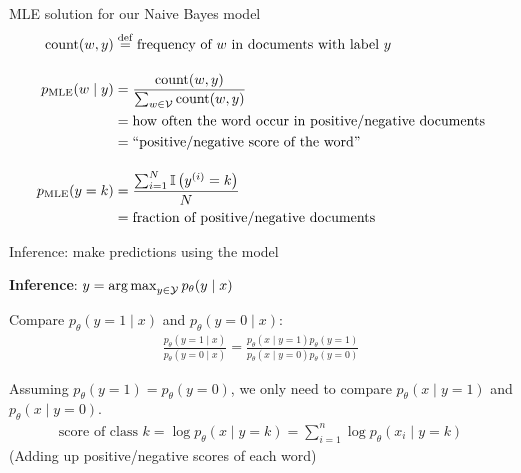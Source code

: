\documentclass[usenames,dvipsnames,notes,11pt,aspectratio=169]{beamer}
\newcommand{\pdfnote}[1]{}
\begin{document}

\begin{frame}
    {MLE solution for our Naive Bayes model}
    \begin{align*}
        \text{count}(w, y) &\stackrel{\rm def}{=} \text{frequency of $w$ in documents with label $y$}\\[1em]
        p_{\text{MLE}}(w\mid y) &= \frac{\text{count}(w, y)}{\sum_{w\in\mathcal{V}}\text{count}(w, y)}\\
        &= \text{how often the word occur in positive/negative documents}\\
        &= \text{``positive/negative score of the word''}\\[1em]
        p_{\text{MLE}}(y=k) &= \frac{\sum_{i=1}^N \mathbb{I}\left( y^{(i)}=k \right)}{N}\\
        &= \text{fraction of positive/negative documents}
    \end{align*}

\end{frame}

\begin{frame}
    {Inference: make predictions using the model}

    \textbf{Inference}: $y=\operatorname*{arg\,max}_{y\in\mathcal{Y}} p_\theta(y\mid x)$ 

    \pause
    Compare $p_\theta(y=1\mid x)$ and $p_\theta(y=0\mid x)$:
    \begin{align*}
        \frac{p_\theta(y=1\mid x)}{p_\theta(y=0\mid x)} = 
        \frac{p_\theta(x\mid y=1)p_\theta(y=1)}{p_\theta(x\mid y=0)p_\theta(y=0)}
    \end{align*}

    \pause
    Assuming $p_\theta(y=1)=p_\theta(y=0)$, we only need to compare $p_\theta(x\mid y=1)$ and $p_\theta(x\mid y=0)$.
    \begin{align*}
        \text{score of class $k$} = \log p_\theta(x \mid y=k) = \sum_{i=1}^n \log p_\theta(x_i \mid y=k) 
    \end{align*}
    (Adding up positive/negative scores of each word)
\end{frame}
\end{document}
